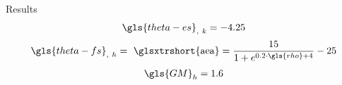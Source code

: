 \begin{frame}{Results}%
    \begin{align}
        \gls{theta-es}_{,~k} = -4.25 \notag
    \end{align}
    \begin{align}
        \gls{theta-fs}_{,~h} =~\text{\glsxtrshort{aea}} = \frac{15}{1 + e^{0.2 \cdot \gls{rho} + 4}} - 25 \notag
    \end{align}
    \begin{align}
        \gls{GM}_h = 1.6 \notag
    \end{align}
    \begin{figure}[H]%
        \centering%
        
    \end{figure}%
\end{frame}%
%